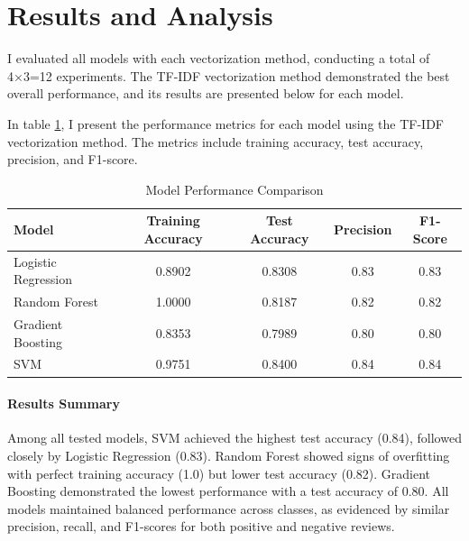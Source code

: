 \documentclass[12pt]{article}
\begin{document}
\section{Results and Analysis}
I evaluated all models with each vectorization method, conducting a total of 4×3=12 experiments. The TF-IDF vectorization method demonstrated the best overall performance, and its results are presented below for each model.

In table \ref{tab:model-performance}, I present the performance metrics for each model using the TF-IDF vectorization method. The metrics include training accuracy, test accuracy, precision, and F1-score.

\begin{table}[h]
\centering
\caption{Model Performance Comparison}
\label{tab:model-performance}
\begin{tabular}{lcccc}
\toprule
\textbf{Model} & \textbf{Training Accuracy} & \textbf{Test Accuracy} & \textbf{Precision} & \textbf{F1-Score} \\
\midrule
Logistic Regression & 0.8902 & 0.8308 & 0.83 & 0.83 \\
Random Forest & 1.0000 & 0.8187 & 0.82 & 0.82 \\
Gradient Boosting & 0.8353 & 0.7989 & 0.80 & 0.80 \\
SVM & 0.9751 & 0.8400 & 0.84 & 0.84 \\
\bottomrule
\end{tabular}
\end{table}

\paragraph{Results Summary}
Among all tested models, SVM achieved the highest test accuracy (0.84), followed closely by Logistic Regression (0.83). Random Forest showed signs of overfitting with perfect training accuracy (1.0) but lower test accuracy (0.82). Gradient Boosting demonstrated the lowest performance with a test accuracy of 0.80. All models maintained balanced performance across classes, as evidenced by similar precision, recall, and F1-scores for both positive and negative reviews.



\end{document}
